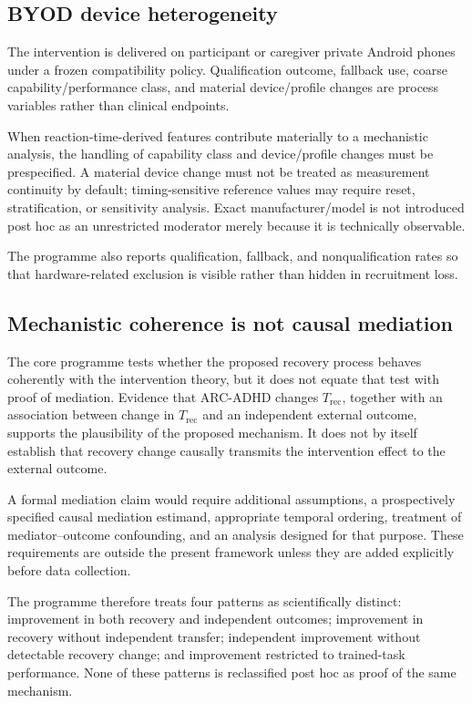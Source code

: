\subsection{BYOD device heterogeneity}

The intervention is delivered on participant or caregiver private Android phones under a frozen compatibility policy. Qualification outcome, fallback use, coarse capability/performance class, and material device/profile changes are process variables rather than clinical endpoints.

When reaction-time-derived features contribute materially to a mechanistic analysis, the handling of capability class and device/profile changes must be prespecified. A material device change must not be treated as measurement continuity by default; timing-sensitive reference values may require reset, stratification, or sensitivity analysis. Exact manufacturer/model is not introduced post hoc as an unrestricted moderator merely because it is technically observable.

The programme also reports qualification, fallback, and nonqualification rates so that hardware-related exclusion is visible rather than hidden in recruitment loss.

\subsection{Mechanistic coherence is not causal mediation}

The core programme tests whether the proposed recovery process behaves coherently with the intervention theory, but it does not equate that test with proof of mediation. Evidence that ARC-ADHD changes \(T_{\mathrm{rec}}\), together with an association between change in \(T_{\mathrm{rec}}\) and an independent external outcome, supports the plausibility of the proposed mechanism. It does not by itself establish that recovery change causally transmits the intervention effect to the external outcome.

A formal mediation claim would require additional assumptions, a prospectively specified causal mediation estimand, appropriate temporal ordering, treatment of mediator--outcome confounding, and an analysis designed for that purpose. These requirements are outside the present framework unless they are added explicitly before data collection.

The programme therefore treats four patterns as scientifically distinct: improvement in both recovery and independent outcomes; improvement in recovery without independent transfer; independent improvement without detectable recovery change; and improvement restricted to trained-task performance. None of these patterns is reclassified post hoc as proof of the same mechanism.


